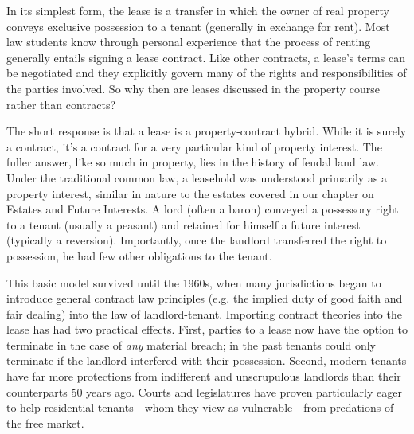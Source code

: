 In its simplest form, the lease is a transfer in which the owner of real
property conveys exclusive possession to a tenant (generally in exchange for
rent).  Most law students know through personal experience that the process of
renting generally entails signing a lease contract.  Like other contracts, a
lease's terms can be negotiated and they explicitly govern many of the rights
and responsibilities of the parties involved.  So why then are leases discussed
in the property course rather than contracts?

The short response is that a lease is a property-contract hybrid. While it is
surely a contract, it's a contract for a very particular kind of property
interest. The fuller answer, like so much in property, lies in the history of
feudal land law.  Under the traditional common law, a leasehold was understood
primarily as a property interest, similar in nature to the estates covered in
our chapter on Estates and Future Interests.  A lord (often a baron) conveyed a
possessory right to a tenant (usually a peasant) and retained for himself a
future interest (typically a reversion). Importantly, once the landlord
transferred the right to possession, he had few other obligations to the
tenant.

This basic model survived until the 1960s, when many jurisdictions began to
introduce general contract law principles (e.g. the implied duty of good faith
and fair dealing) into the law of landlord-tenant.  Importing contract theories
into the lease has had two practical effects.  First, parties to a lease now
have the option to terminate in the case of \textit{any} material breach; in
the past tenants could only terminate if the landlord interfered with their
possession.  Second, modern tenants have far more protections from indifferent
and unscrupulous landlords than their counterparts 50 years ago.  Courts and
legislatures have proven particularly eager to help residential tenants---whom
they view as vulnerable---from predations of the free market. 


